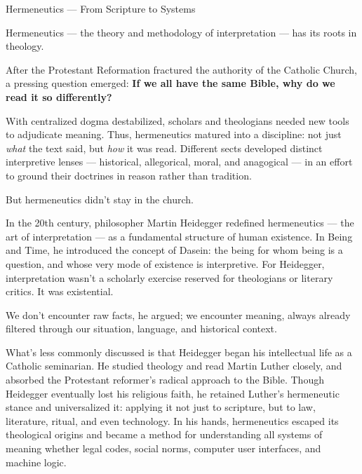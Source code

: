 \begin{PhilosophicalSidebar}{Hermeneutics --- From Scripture to Systems}

    Hermeneutics — the theory and methodology of interpretation — has its roots in theology.
    
    \medskip
    
    After the Protestant Reformation fractured the authority of the Catholic Church, a pressing question emerged:  
    \textbf{If we all have the same Bible, why do we read it so differently?}
    
    \medskip
    
    With centralized dogma destabilized, scholars and theologians needed new tools to adjudicate meaning. Thus, 
    hermeneutics matured into a discipline: not just \textit{what} the text said, but \textit{how} it was read.  
    Different sects developed distinct interpretive lenses — historical, allegorical, moral, and anagogical — 
    in an effort to ground their doctrines in reason rather than tradition.
    
    \medskip
    
    But hermeneutics didn’t stay in the church.
    
    \medskip
    
    In the 20th century, philosopher Martin Heidegger redefined hermeneutics — the art of interpretation — as a 
    fundamental structure of human existence. In Being and Time, he introduced the concept of Dasein: the being for 
    whom being is a question, and whose very mode of existence is interpretive. For Heidegger, interpretation wasn’t 
    a scholarly exercise reserved for theologians or literary critics. It was existential. 

    \medskip
    
    We don’t encounter raw facts, he argued; we encounter meaning, always already filtered through our situation, 
    language, and historical context. 

    \medskip
    
    What’s less commonly discussed is that Heidegger began his intellectual life as 
    a Catholic seminarian. He studied theology and read Martin Luther closely, and absorbed the Protestant reformer’s 
    radical approach to the Bible. Though Heidegger eventually lost his religious faith, he retained Luther’s hermeneutic 
    stance and universalized it: applying it not just to scripture, but to law, literature, ritual, and even technology. 
    In his hands, hermeneutics escaped its theological origins and became a method for understanding all systems of 
    meaning whether legal codes, social norms, computer user interfaces, and machine logic.
    

\end{PhilosophicalSidebar}
